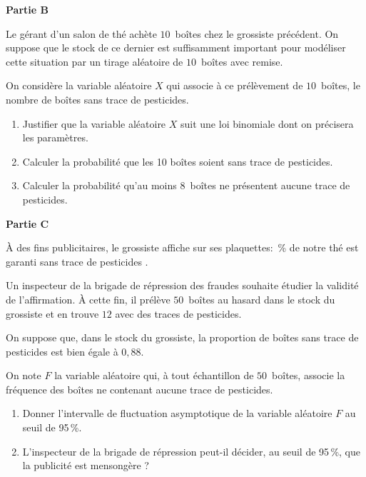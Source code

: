 \documentclass[10pt]{article}
\begin{document}
\bigskip
 
\textbf{Partie B}

\medskip
 
Le gérant d'un salon de thé achète $10$~boîtes chez le grossiste précédent. On suppose que le stock de ce dernier est suffisamment important pour modéliser cette situation par un tirage aléatoire de $10$~boîtes avec remise.
 
On considère la variable aléatoire $X$ qui associe à ce prélèvement de $10$~boîtes, le nombre de boîtes sans trace de pesticides.

\medskip
 
\begin{enumerate}
\item Justifier que la variable aléatoire $X$ suit une loi binomiale dont on précisera les paramètres. 
\item Calculer la probabilité que les 10 boîtes soient sans trace de pesticides. 
\item Calculer la probabilité qu'au moins $8$~boîtes ne présentent aucune trace de pesticides.
\end{enumerate}
 
\bigskip
 
\textbf{Partie C}

\medskip
 
À des fins publicitaires, le grossiste affiche sur ses plaquettes: \,\% de notre thé est garanti sans trace de pesticides \fg. 

Un inspecteur de la brigade de répression des fraudes souhaite étudier la validité de l'affirmation. À cette fin, il prélève $50$~boîtes au hasard dans le stock du grossiste et en trouve $12$ avec des traces de pesticides.

\medskip
 
On suppose que, dans le stock du grossiste, la proportion de boîtes sans trace de pesticides est bien égale à $0,88$.
 
On note $F$ la variable aléatoire qui, à tout échantillon de $50$~boîtes, associe la fréquence des boîtes ne contenant aucune trace de pesticides.

\medskip
 
\begin{enumerate}
\item Donner l'intervalle de fluctuation asymptotique de la variable aléatoire $F$ au seuil de 95\,\%. 
\item L'inspecteur de la brigade de répression peut-il décider, au seuil de 95\,\%, que la publicité est mensongère ? 
\end{enumerate}
 
\end{document}
